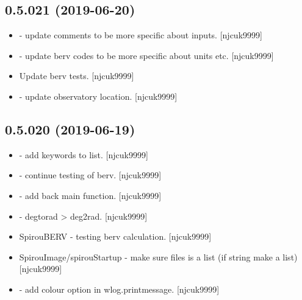 \documentclass[a4paper,10pt,english]{report}
\begin{document}
\subsection{0.5.021 (2019-06-20)}
\label{\detokenize{misc/changelog:id115}}\begin{itemize}
\item {} 
 - update comments to be more specific about inputs.
{[}njcuk9999{]}

\item {} 
 - update berv codes to be more specific about units etc.
{[}njcuk9999{]}

\item {} 
Update berv tests. {[}njcuk9999{]}

\item {} 
 - update observatory location. {[}njcuk9999{]}

\end{itemize}


\subsection{0.5.020 (2019-06-19)}
\label{\detokenize{misc/changelog:id116}}\begin{itemize}
\item {} 
 - add keywords to list. {[}njcuk9999{]}

\item {} 
 - continue testing of berv. {[}njcuk9999{]}

\item {} 
 - add back main function. {[}njcuk9999{]}

\item {} 
 - degtorad \textendash{}\textgreater{} deg2rad. {[}njcuk9999{]}

\item {} 
SpirouBERV - testing berv calculation. {[}njcuk9999{]}

\item {} 
SpirouImage/spirouStartup - make sure files is a list (if string make
a list) {[}njcuk9999{]}

\item {} 
 - add colour option in wlog.printmessage. {[}njcuk9999{]}

\end{itemize}
\end{document}
